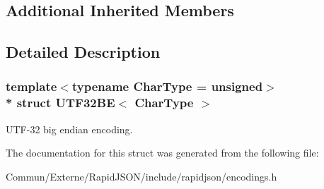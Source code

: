 \subsection*{Additional Inherited Members}


\subsection{Detailed Description}
\subsubsection*{template$<$typename Char\+Type = unsigned$>$\\*
struct U\+T\+F32\+B\+E$<$ Char\+Type $>$}

U\+T\+F-\/32 big endian encoding. 

The documentation for this struct was generated from the following file\+:\begin{DoxyCompactItemize}
\item 
Commun/\+Externe/\+Rapid\+J\+S\+O\+N/include/rapidjson/encodings.\+h\end{DoxyCompactItemize}
